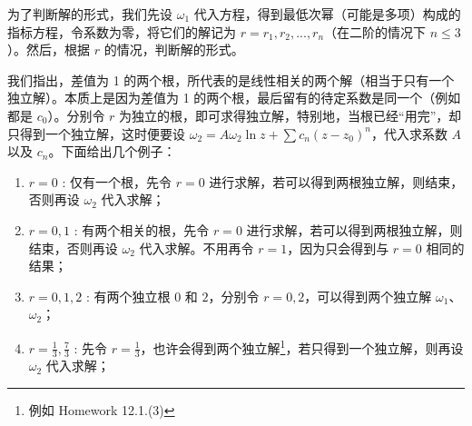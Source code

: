 \documentclass[UTF8]{report}
\theoremstyle{MyLineTheoremStyle} %
\theoremstyle{MyBlockTheoremStyle} %
\theoremstyle{MySubsubsectionStyle} %
\begin{document}
为了判断解的形式，我们先设 $\omega_1$ 代入方程，得到最低次幂（可能是多项）构成的指标方程，令系数为零，将它们的解记为 $r = r_1, r_2, ..., r_n$（在二阶的情况下 $n \leqslant 3$）。然后，根据 $r$ 的情况，判断解的形式。

我们指出，差值为 1 的两个根，所代表的是线性相关的两个解（相当于只有一个独立解）。本质上是因为差值为 1 的两个根，最后留有的待定系数是同一个（例如都是 $c_0$）。分别令 $r$ 为独立的根，即可求得独立解，特别地，当根已经“用完”，却只得到一个独立解，这时便要设 $\omega_2 = A \omega_2 \ln z + \sum c_n (z - z_0)^n$，代入求系数 $A$ 以及 $c_n$。下面给出几个例子：
\begin{enumerate}
\item $r = 0$ : 仅有一个根，先令 $r = 0$ 进行求解，若可以得到两根独立解，则结束，否则再设 $\omega_2$ 代入求解；
\item $r = 0, 1$ : 有两个相关的根，先令 $r = 0$ 进行求解，若可以得到两根独立解，则结束，否则再设 $\omega_2$ 代入求解。不用再令 $r = 1$，因为只会得到与 $r = 0$ 相同的结果；
\item $r = 0, 1, 2$ : 有两个独立根 $0$ 和 $2$，分别令 $r = 0, 2$，可以得到两个独立解 $\omega_1$、$\omega_2$；
\item $r = \frac{1}{3}, \frac{7}{3}$ : 先令 $r = \frac{1}{3}$，也许会得到两个独立解\footnote{例如 Homework 12.1.(3)}，若只得到一个独立解，则再设 $\omega_2$ 代入求解；
\end{enumerate} 
\end{document}
